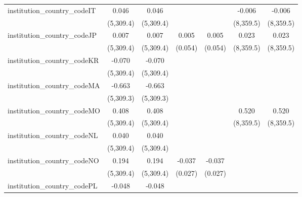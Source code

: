 \begin{tabular}{lcccccc}
   institution\_country\_codeIT          & 0.046         & 0.046         &                &                & -0.006         & -0.006\\   
                                         & (5,309.4)     & (5,309.4)     &                &                & (8,359.5)      & (8,359.5)\\   
   institution\_country\_codeJP          & 0.007         & 0.007         & 0.005          & 0.005          & 0.023          & 0.023\\   
                                         & (5,309.4)     & (5,309.4)     & (0.054)        & (0.054)        & (8,359.5)      & (8,359.5)\\   
   institution\_country\_codeKR          & -0.070        & -0.070        &                &                &                &   \\   
                                         & (5,309.4)     & (5,309.4)     &                &                &                &   \\   
   institution\_country\_codeMA          & -0.663        & -0.663        &                &                &                &   \\   
                                         & (5,309.3)     & (5,309.3)     &                &                &                &   \\   
   institution\_country\_codeMO          & 0.408         & 0.408         &                &                & 0.520          & 0.520\\   
                                         & (5,309.4)     & (5,309.4)     &                &                & (8,359.5)      & (8,359.5)\\   
   institution\_country\_codeNL          & 0.040         & 0.040         &                &                &                &   \\   
                                         & (5,309.4)     & (5,309.4)     &                &                &                &   \\   
   institution\_country\_codeNO          & 0.194         & 0.194         & -0.037         & -0.037         &                &   \\   
                                         & (5,309.4)     & (5,309.4)     & (0.027)        & (0.027)        &                &   \\   
   institution\_country\_codePL          & -0.048        & -0.048        &                &                &                &   \\   

\end{tabular}
